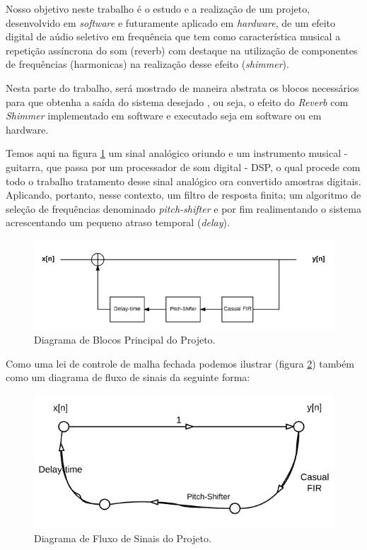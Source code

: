 	Nosso objetivo neste trabalho é o estudo e a realização de um projeto, desenvolvido em \textit{software} e futuramente aplicado em \textit{hardware}, de um efeito digital de aúdio seletivo em frequência que tem como característica musical a repetição assíncrona do som (reverb) com destaque na utilização de componentes de frequências (harmonicas) na realização desse efeito (\textit{shimmer}).
	
	Nesta parte do trabalho, será mostrado de maneira abstrata os blocos necessários para que obtenha a saída do sistema desejado , ou seja, o efeito do \textit{Reverb} com \textit{Shimmer} implementado em software e executado seja em software ou em hardware.
		
	Temos aqui na figura \ref{bloco-principal} um sinal analógico oriundo e um instrumento musical - guitarra, que passa por um processador de som digital - DSP, o qual procede com todo o trabalho tratamento desse sinal analógico ora convertido amostras digitais. Aplicando, portanto, nesse contexto, um filtro de resposta finita; um algoritmo de seleção de frequências denominado \textit{pitch-shifter} e por fim realimentando o sistema acrescentando um pequeno atraso temporal (\textit{delay}).
	
	\begin{figure}[!h t b]
		\centering
		\includegraphics[scale=0.5]{./figuras/diagrama_bloco_principal.PNG}
		\caption{Diagrama de Blocos Principal do Projeto.}
		\label{bloco-principal}
	\end{figure}
	

	Como uma lei de controle de malha fechada podemos ilustrar (figura \ref{signal_principal}) também como um diagrama de fluxo de sinais da seguinte forma:
	
	\begin{figure}[!h t b]
		\centering
		\includegraphics[scale=0.5]{./figuras/fluxo_de_sinais_principal.png}
		\caption{Diagrama de Fluxo de Sinais do Projeto.}	
		\label{signal_principal}
	\end{figure}
	
